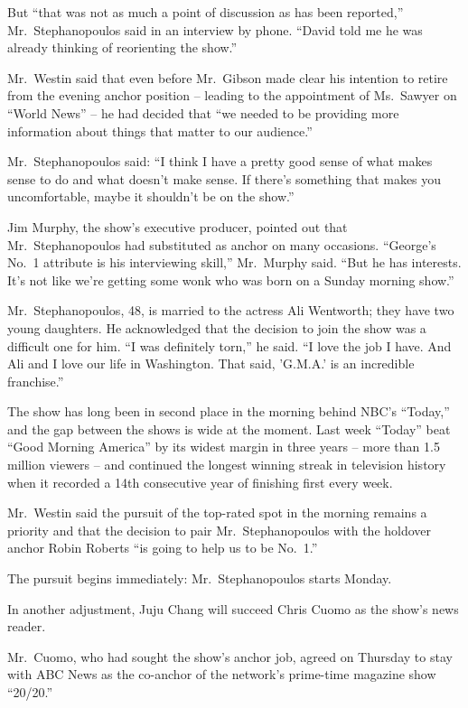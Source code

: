 ﻿\documentclass[12pt]{article}
\begin{document}
But ``that was not as much a point of discussion as has been reported,'' Mr.~Stephanopoulos said in
an interview by phone. ``David told me he was already thinking of reorienting the show.''

Mr.~Westin said that even before Mr.~Gibson made clear his intention to retire from the evening
anchor position -- leading to the appointment of Ms.~Sawyer on ``World News'' -- he had decided that
``we needed to be providing more information about things that matter to our audience.''

Mr.~Stephanopoulos said: ``I think I have a pretty good sense of what makes sense to do and what
doesn't make sense. If there's something that makes you uncomfortable, maybe it shouldn't be on the
show.''

Jim Murphy, the show's executive producer, pointed out that Mr.~Stephanopoulos had substituted as
anchor on many occasions. ``George's No.~1 attribute is his interviewing skill,'' Mr.~Murphy said.
``But he has interests. It's not like we're getting some wonk who was born on a Sunday morning
show.''

Mr.~Stephanopoulos, 48, is married to the actress Ali Wentworth; they have two young daughters. He
acknowledged that the decision to join the show was a difficult one for him. ``I was definitely
torn,'' he said. ``I love the job I have. And Ali and I love our life in Washington. That said,
'G.M.A.' is an incredible franchise.''

The show has long been in second place in the morning behind NBC's ``Today,'' and the gap between
the shows is wide at the moment. Last week ``Today'' beat ``Good Morning America'' by its widest
margin in three years -- more than 1.5 million viewers -- and continued the longest winning streak
in television history when it recorded a 14th consecutive year of finishing first every week.

Mr.~Westin said the pursuit of the top-rated spot in the morning remains a priority and that the
decision to pair Mr.~Stephanopoulos with the holdover anchor Robin Roberts ``is going to help us to
be No.~1.''

The pursuit begins immediately: Mr.~Stephanopoulos starts Monday.

In another adjustment, Juju Chang will succeed Chris Cuomo as the show's news reader.

Mr.~Cuomo, who had sought the show's anchor job, agreed on Thursday to stay with ABC News as the
co-anchor of the network's prime-time magazine show ``20/20.''
\end{document}
